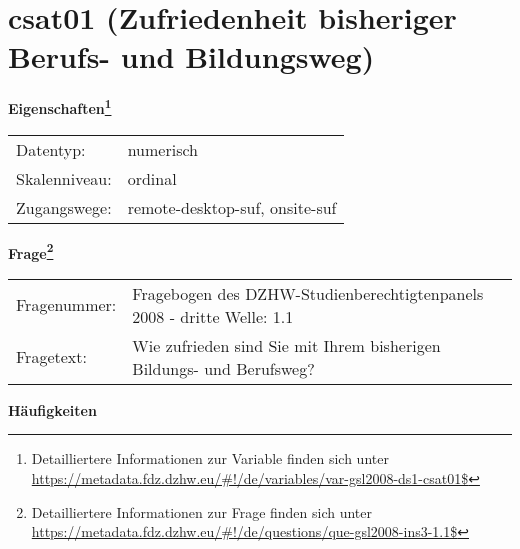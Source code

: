 
    \setcounter{footnote}{0}

    \vspace*{-1.8cm}
	\section{csat01 (Zufriedenheit bisheriger Berufs- und Bildungsweg)}
	\label{section:csat01}



    \vspace*{0.5cm}
    \noindent\textbf{Eigenschaften\footnote{Detailliertere Informationen zur Variable finden sich unter
		\url{https://metadata.fdz.dzhw.eu/\#!/de/variables/var-gsl2008-ds1-csat01$}}}\\
	\begin{tabularx}{\hsize}{@{}lX}
	Datentyp: & numerisch \\
	Skalenniveau: & ordinal \\
	Zugangswege: &
	  remote-desktop-suf, 
	  onsite-suf
 \\
    \end{tabularx}



				\vspace*{0.5cm}
                \noindent\textbf{Frage\footnote{Detailliertere Informationen zur Frage finden sich unter
		              \url{https://metadata.fdz.dzhw.eu/\#!/de/questions/que-gsl2008-ins3-1.1$}}}\\
				\begin{tabularx}{\hsize}{@{}lX}
					Fragenummer: &
					  Fragebogen des DZHW-Studienberechtigtenpanels 2008 - dritte Welle:
					  1.1
 \\
					Fragetext: & Wie zufrieden sind Sie mit Ihrem bisherigen Bildungs- und Berufsweg? \\
				\end{tabularx}





        		\vspace*{0.5cm}
                \noindent\textbf{Häufigkeiten}

